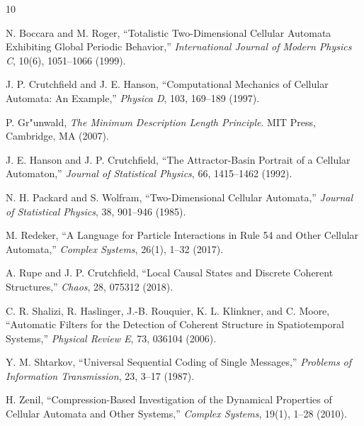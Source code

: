 \documentclass[10pt,twoside]{article}
\begin{document}
\begin{thebibliography}{10}

N. Boccara and M. Roger, ``Totalistic Two-Dimensional Cellular Automata Exhibiting Global Periodic Behavior,'' \emph{International Journal of Modern Physics C}, 10(6), 1051--1066 (1999).

J. P. Crutchfield and J. E. Hanson, ``Computational Mechanics of Cellular Automata: An Example,'' \emph{Physica D}, 103, 169--189 (1997).

P. Gr{"u}nwald, \emph{The Minimum Description Length Principle}. MIT Press, Cambridge, MA (2007).

J. E. Hanson and J. P. Crutchfield, ``The Attractor-Basin Portrait of a Cellular Automaton,'' \emph{Journal of Statistical Physics}, 66, 1415--1462 (1992).

N. H. Packard and S. Wolfram, ``Two-Dimensional Cellular Automata,'' \emph{Journal of Statistical Physics}, 38, 901--946 (1985).

M. Redeker, ``A Language for Particle Interactions in Rule 54 and Other Cellular Automata,'' \emph{Complex Systems}, 26(1), 1--32 (2017).

A. Rupe and J. P. Crutchfield, ``Local Causal States and Discrete Coherent Structures,'' \emph{Chaos}, 28, 075312 (2018).

C. R. Shalizi, R. Haslinger, J.-B. Rouquier, K. L. Klinkner, and C. Moore, ``Automatic Filters for the Detection of Coherent Structure in Spatiotemporal Systems,'' \emph{Physical Review E}, 73, 036104 (2006).

Y. M. Shtarkov, ``Universal Sequential Coding of Single Messages,'' \emph{Problems of Information Transmission}, 23, 3--17 (1987).

H. Zenil, ``Compression-Based Investigation of the Dynamical Properties of Cellular Automata and Other Systems,'' \emph{Complex Systems}, 19(1), 1--28 (2010).

\end{thebibliography}
\end{document}

